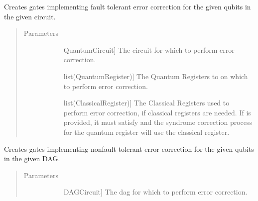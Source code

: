 \documentclass[letterpaper,10pt,english]{sphinxmanual}
\begin{document}
\begin{fulllineitems}
\begin{fulllineitems}
\label{\detokenize{Base:BaseFaultTolerance.ErrorCorrector.errorCorrectCircuit}}
Creates gates implementing fault tolerant error correction for the given qubits in the given circuit.
\begin{quote}\begin{description}
\item[{Parameters}] \leavevmode\begin{description}
\item[{}] \leavevmode{[}QuantumCircuit{]}
The circuit for which to perform error correction.

\item[{}] \leavevmode{[}list(QuantumRegister){]}
The Quantum Registers to on which to perform error correction.

\item[{}] \leavevmode{[}list(ClassicalRegister){]}
The Classical Registers used to perform error correction, if classical registers are needed. If  is provided, it must satisfy  and the syndrome correction process for the  quantum register will use the  classical register.

\end{description}

\end{description}\end{quote}

\end{fulllineitems}


\begin{fulllineitems}
\label{\detokenize{Base:BaseFaultTolerance.ErrorCorrector.errorCorrectDag}}
Creates gates implementing non\sphinxhyphen{}fault tolerant error correction for the given qubits in the given DAG.
\begin{quote}\begin{description}
\item[{Parameters}] \leavevmode\begin{description}
\item[{}] \leavevmode{[}DAGCircuit{]}
The dag for which to perform error correction.


\end{description}
\end{description}
\end{quote}
\end{fulllineitems}
\end{fulllineitems}
\end{document}
